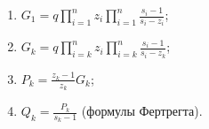 \begin{enumerate}
\item $G_1 = q\prod\limits_{i=1}^{n}z_i
\prod\limits_{i=1}^{n}\frac{s_i - 1}{s_i - z_i}$;
\item $G_k = q\prod\limits_{i=k}^{n}z_i
\prod\limits_{i=k}^{n}\frac{s_i-1}{s_i - z_k}$;
\item $P_k = \frac{z_k - 1}{z_k}G_k$;
\item $Q_k = \frac{P_k}{s_k - 1}$ (формулы Фертрегта).
\end{enumerate}
